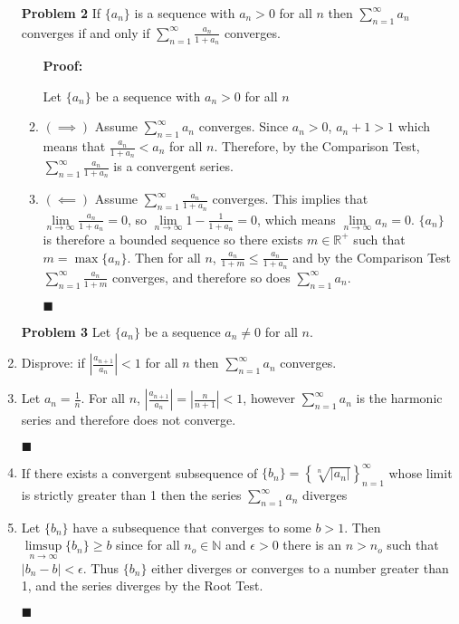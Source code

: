 \documentclass[a4paper,12pt]{report}
\newcommand{\bb}[1]{\mathbb{#1}}
\newcommand{\proof}[3]{
	\begin{enumerate}
		\item[\bf{Problem #1}] #2
		\begin{enumerate}
			\item[\textbf{Proof:}]
			#3
			\begin{flushright}
				$\blacksquare$
			\end{flushright}
		\end{enumerate}
	\end{enumerate}
}
\newcommand{\problem}[3]{
	\begin{enumerate}
		\item[\bf{Problem #1}] #2 
		#3
	\end{enumerate}
}
\newcommand{\subproof}[3]{
	\item[#1] #2
	\item[\bf{Proof:}] 
	#3 
	\begin{flushright}
		$\blacksquare$
	\end{flushright}
}
\begin{document}
\proof{2}{
	If $\{a_n\}$ is a sequence with $a_n > 0$ for all $n$ then $\sum\limits_{n=1}^{\infty}a_n$ converges if and only if ${\sum\limits_{n=1}^{\infty}}\frac{a_n}{1 + a_n}$ converges.
}{
	Let $\{a_n\}$ be a sequence with $a_n > 0$ for all $n$
	\item[$(\implies)$]
		Assume $\sum\limits_{n=1}^{\infty}a_n$ converges. Since $a_n > 0$, $a_n + 1 > 1$ which means that $\frac{a_n}{1 + a_n} < a_n$ for all $n$. Therefore, by the Comparison Test, ${\sum\limits_{n=1}^{\infty}}\frac{a_n}{1 + a_n}$ is a convergent series.
	\item[$(\impliedby)$] 
		Assume ${\sum\limits_{n=1}^{\infty}}\frac{a_n}{1 + a_n}$ converges. This implies that $\lim\limits_{n \to \infty}\frac{a_n}{1 + a_n} = 0$, so $\lim\limits_{n \to \infty} 1 - \frac{1}{1 + a_n} = 0$, which means $\lim\limits_{n \to \infty}a_n = 0$. $\{a_n\}$ is therefore a bounded sequence so there exists $m \in \bb{R^+}$ such that $m = \max\{a_n\}$. Then for all $n$, $\frac{a_n}{1 + m} \leqslant \frac{a_n}{1 + a_n}$ and by the Comparison Test $\sum\limits_{n=1}^{\infty}\frac{a_n}{1 + m}$ converges, and therefore so does $\sum\limits_{n=1}^{\infty}a_n$.
}


\problem{3}{
	Let $\{a_n\}$ be a sequence $a_n \neq 0$ for all $n$.
}{
	\subproof{(a)}{
		Disprove: if $\left|\frac{a_{n+1}}{a_n}\right| < 1$ for all $n$ then $\sum\limits_{n=1}^{\infty}a_n$ converges.
	}{
		Let $a_n = \frac{1}{n}$. For all $n$, $\left|\frac{a_{n+1}}{a_n}\right| = \left|\frac{n}{n+1}\right| < 1$, however $\sum\limits_{n=1}^{\infty}a_n$ is the harmonic series and therefore does not converge.
	}
	
	\subproof{(b)}{
		If there exists a convergent subsequence of $\{b_n\} = \left\{\sqrt[n]{|a_n|}\right\}_{n=1}^{\infty}$ whose limit is strictly greater than 1 then the series $\sum\limits_{n=1}^{\infty}a_n$ diverges
	}{
		Let $\{b_n\}$ have a subsequence that converges to some $b > 1$. Then $\limsup\limits_{n \to \infty}\{b_n\} \geqslant b$ since for all $n_o \in \bb{N}$ and $\epsilon > 0$ there is an $n > n_o$ such that $|b_n - b| < \epsilon$. Thus $\{b_n\}$ either diverges or converges to a number greater than 1, and the series diverges by the Root Test.
	}
}

\pagebreak
\end{document}
